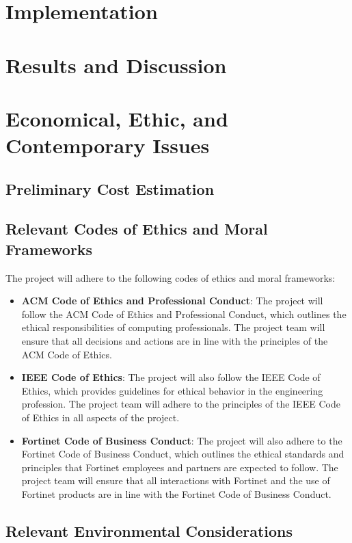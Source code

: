 \documentclass[12pt]{report}
\begin{document}
\chapter{Implementation}

\chapter{Results and Discussion}

\chapter{Economical, Ethic, and Contemporary Issues}

\section{Preliminary Cost Estimation}
\section{Relevant Codes of Ethics and Moral Frameworks}
The project will adhere to the following codes of ethics and moral frameworks:
\begin{itemize}
    \item \textbf{ACM Code of Ethics and Professional Conduct}: The project will follow the ACM Code of Ethics and Professional Conduct, which outlines the ethical responsibilities of computing professionals. The project team will ensure that all decisions and actions are in line with the principles of the ACM Code of Ethics.
    \item \textbf{IEEE Code of Ethics}: The project will also follow the IEEE Code of Ethics, which provides guidelines for ethical behavior in the engineering profession. The project team will adhere to the principles of the IEEE Code of Ethics in all aspects of the project.
    \item \textbf{Fortinet Code of Business Conduct}: The project will also adhere to the Fortinet Code of Business Conduct, which outlines the ethical standards and principles that Fortinet employees and partners are expected to follow. The project team will ensure that all interactions with Fortinet and the use of Fortinet products are in line with the Fortinet Code of Business Conduct.
\end{itemize}
\section{Relevant Environmental Considerations}
\end{document}
